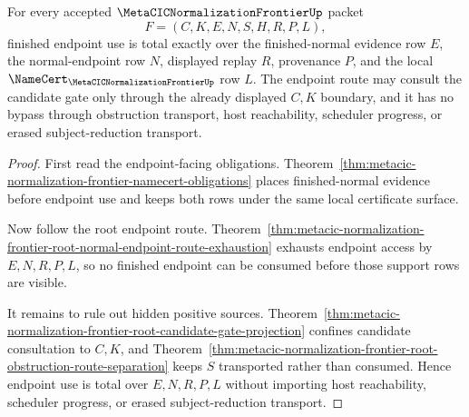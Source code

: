\begin{theorem}
\label{thm:metacic-normalization-frontier-finished-endpoint-use-totality}
For every accepted $\MetaCICNormalizationFrontierUp$ packet
$$
F=(C,K,E,N,S,H,R,P,L),
$$
finished endpoint use is total exactly over the finished-normal evidence row $E$, the normal-endpoint row $N$, displayed replay $R$, provenance $P$, and the local $\NameCert_{\MetaCICNormalizationFrontierUp}$ row $L$. The endpoint route may consult the candidate gate only through the already displayed $C,K$ boundary, and it has no bypass through obstruction transport, host reachability, scheduler progress, or erased subject-reduction transport.
\end{theorem}
\begin{proof}
First read the endpoint-facing obligations. Theorem~\ref{thm:metacic-normalization-frontier-namecert-obligations} places finished-normal evidence before endpoint use and keeps both rows under the same local certificate surface.

Now follow the root endpoint route. Theorem~\ref{thm:metacic-normalization-frontier-root-normal-endpoint-route-exhaustion} exhausts endpoint access by $E,N,R,P,L$, so no finished endpoint can be consumed before those support rows are visible.

It remains to rule out hidden positive sources. Theorem~\ref{thm:metacic-normalization-frontier-root-candidate-gate-projection} confines candidate consultation to $C,K$, and Theorem~\ref{thm:metacic-normalization-frontier-root-obstruction-route-separation} keeps $S$ transported rather than consumed. Hence endpoint use is total over $E,N,R,P,L$ without importing host reachability, scheduler progress, or erased subject-reduction transport.
\end{proof}

